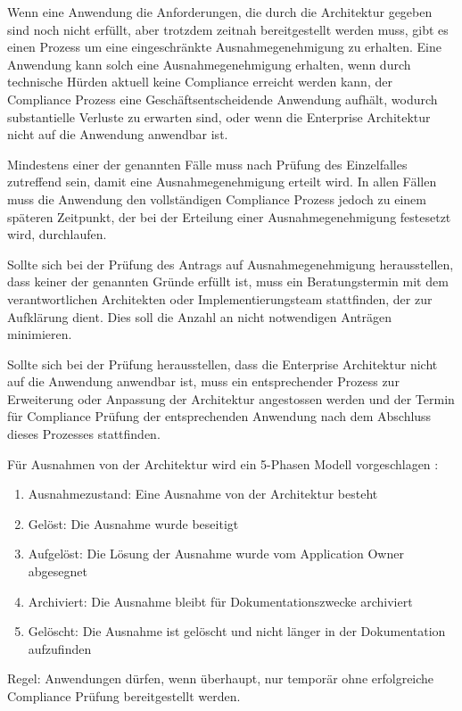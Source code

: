 Wenn eine Anwendung die Anforderungen, die durch die Architektur gegeben sind noch nicht erfüllt, aber trotzdem zeitnah bereitgestellt werden muss, gibt es einen Prozess um eine eingeschränkte Ausnahmegenehmigung zu erhalten. Eine Anwendung kann solch eine Ausnahmegenehmigung erhalten, wenn durch technische Hürden aktuell keine Compliance erreicht werden kann, der Compliance Prozess eine Geschäftsentscheidende Anwendung aufhält, wodurch substantielle Verluste zu erwarten sind, oder wenn die Enterprise Architektur nicht auf die Anwendung anwendbar ist. 

Mindestens einer der genannten Fälle muss nach Prüfung des Einzelfalles zutreffend sein, damit eine Ausnahmegenehmigung erteilt wird. In allen Fällen muss die Anwendung den vollständigen Compliance Prozess jedoch zu einem späteren Zeitpunkt, der bei der Erteilung einer Ausnahmegenehmigung festesetzt wird, durchlaufen. 

Sollte sich bei der Prüfung des Antrags auf Ausnahmegenehmigung herausstellen, dass keiner der genannten Gründe erfüllt ist, muss ein Beratungstermin mit dem verantwortlichen Architekten oder Implementierungsteam stattfinden, der zur Aufklärung dient. Dies soll die Anzahl an nicht notwendigen Anträgen minimieren. 

Sollte sich bei der Prüfung herausstellen, dass die Enterprise Architektur nicht auf die Anwendung anwendbar ist, muss ein entsprechender Prozess zur Erweiterung oder Anpassung der Architektur angestossen werden und der Termin für Compliance Prüfung der entsprechenden Anwendung nach dem Abschluss dieses Prozesses stattfinden.

Für Ausnahmen von der Architektur wird ein 5-Phasen Modell vorgeschlagen \cite{exception-governance}:

\begin{enumerate}
\item Ausnahmezustand: Eine Ausnahme von der Architektur besteht
\item Gelöst: Die Ausnahme wurde beseitigt
\item Aufgelöst: Die Lösung der Ausnahme wurde vom Application Owner abgesegnet
\item Archiviert: Die Ausnahme bleibt für Dokumentationszwecke archiviert
\item Gelöscht: Die Ausnahme ist gelöscht und nicht länger in der Dokumentation aufzufinden
\end{enumerate}

Regel: Anwendungen dürfen, wenn überhaupt, nur temporär ohne erfolgreiche Compliance Prüfung bereitgestellt werden.
